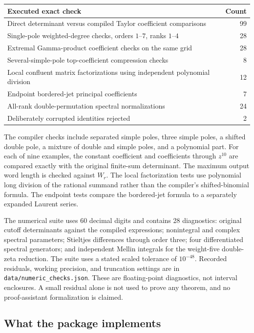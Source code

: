 \documentclass[11pt,letterpaper]{article}
\numberwithin{equation}{section}
\theoremstyle{definition}\newtheorem{definition}[theorem]{Definition}
\theoremstyle{remark}\newtheorem{remark}[theorem]{Remark}
\newcommand{\src}[1]{\nolinkurl{#1}}
\begin{document}
\begin{center}
\begin{tabular}{p{}r}
\toprule
Executed exact check & Count\\\midrule
Direct determinant versus compiled Taylor coefficient comparisons & 99\\
Single-pole weighted-degree checks, orders $1$--$7$, ranks $1$--$4$ & 28\\
Extremal Gamma-product coefficient checks on the same grid & 28\\
Several-simple-pole top-coefficient compression checks & 8\\
Local confluent matrix factorizations using independent polynomial division & 12\\
Endpoint bordered-jet principal coefficients & 7\\
All-rank double-permutation spectral normalizations & 24\\
Deliberately corrupted identities rejected & 2\\\bottomrule
\end{tabular}
\end{center}

The compiler checks include separated simple poles, three simple poles,
a shifted double pole, a mixture of double and simple poles, and a
polynomial part. For each of nine examples, the constant coefficient
and coefficients through $z^{10}$ are compared exactly with the
original finite-sum determinant. The maximum output word length is
checked against $W_r$. The local factorization tests use polynomial
long division of the rational summand rather than the compiler's
shifted-binomial formula. The endpoint tests compare the bordered-jet
formula to a separately expanded Laurent series.

The numerical suite uses 60 decimal digits and contains 28 diagnostics:
original cutoff determinants against the compiled expressions;
nonintegral and complex spectral parameters; Stieltjes differences
through order three; four differentiated spectral generators; and
independent Mellin integrals for the weight-five double-zeta reduction.
The suite uses a stated scaled tolerance of $10^{-48}$. Recorded residuals,
working precision, and truncation settings are in
\src{data/numeric_checks.json}. These are floating-point diagnostics,
not interval enclosures. A small residual alone is not used to prove
any theorem, and no proof-assistant formalization is claimed.

\subsection{What the package implements}
\end{document}
